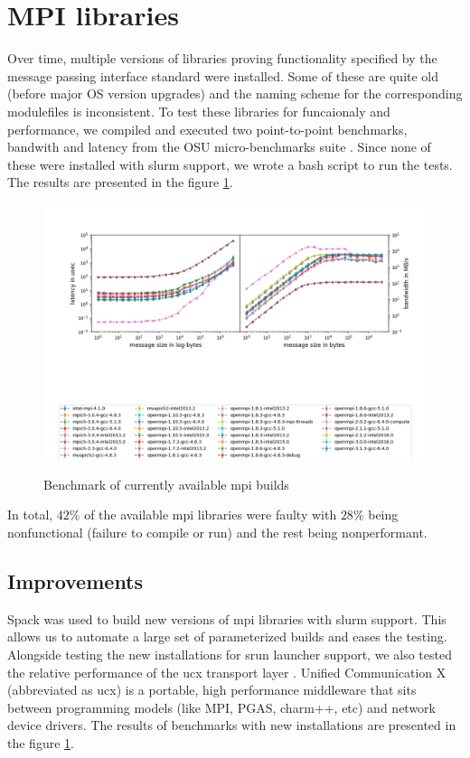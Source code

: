 \documentclass[sigconf,authordraft]{acmart}
\begin{document}
\section{MPI libraries}
Over time, multiple versions of libraries proving functionality specified by the message passing interface standard \cite{mpi_3_1,mpi_2_2} were installed. Some of these are quite old (before major OS version upgrades) and the naming scheme for the corresponding modulefiles is inconsistent. To test these libraries for funcaionaly and performance, we compiled and executed two point-to-point benchmarks, bandwith and latency from the OSU micro-benchmarks suite \cite{osu_bench_website}. Since none of these were installed with slurm support, we wrote a bash script to run the tests. The results are presented in the figure \ref{fig:currmpi}.

\begin{figure}[h]
	\centering
	\includegraphics[width=\linewidth]{curr_mpi_combined}
	\caption{Benchmark of currently available mpi builds}
		  \label{fig:currmpi}
\end{figure}

In total, $42\%$ of the available mpi libraries were faulty with $28\%$ being nonfunctional (failure to compile or run) and the rest being nonperformant.

\subsection{Improvements}
 
Spack\cite{spack} was used to build new versions of mpi libraries with slurm support. This allows us to automate a large set of parameterized builds and eases the testing. Alongside testing the new installations for srun launcher support, we also tested the relative performance of the ucx transport layer \cite{shamis2015ucx,openucx-website}. Unified Communication X (abbreviated as ucx) is a portable, high performance middleware that sits between programming models (like MPI, PGAS, charm++, etc) and network device drivers. The results of benchmarks with new installations are presented in the figure \ref{fig:currmpi}. 
\end{document}
